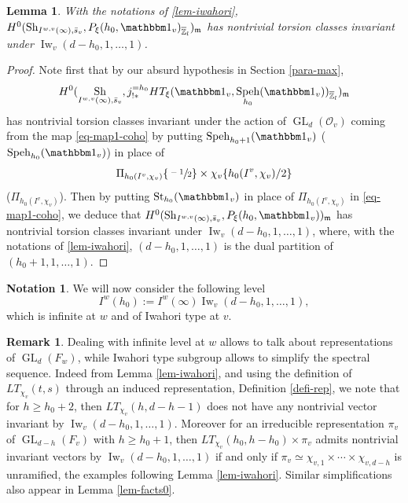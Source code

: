 \documentclass[JEP,XML,SOM,Unicode,published]{cedram}
\let\mathds\mathbbm
\DeclareMathOperator{\GL}{GL}
\theoremstyle{plain}
\newtheorem{lemma}[equation]{Lemma}
\theoremstyle{definition}
\newtheorem*{remark}{Remark}
\newtheorem{nota}[equation]{Notation}
\numberwithin{equation}{subsection}
\newcommand\Zm{{\mathbb Z}}
\newcommand\OC{{\mathcal O}}
\DeclareMathOperator{\sh}{Sh}
\DeclareMathOperator{\Iw}{Iw}
\DeclareMathOperator{\speh}{Speh}
\DeclareMathOperator{\st}{St}
\let \oo=\infty
\begin{document}
\begin{lemma} \label{lem-oo-finite}
With the notations of \ref{lem-iwahori},
$H^0(\sh_{I^{w,v}(\oo),\bar s_v},P_\xi(h_0,\mathds 1_v)_{\overline \Zm_l})_{\mathfrak m}$ has nontrivial torsion
classes invariant under $\Iw_v(d-h_0,1,\dots,1)$.
\end{lemma}

\begin{proof}
Note first that by our absurd hypothesis in Section \ref{para-max},
\[
H^0(\sh_{I^{w,v}(\oo),\bar s_v},j^{=h_0}_{!*}
HT_\xi(\mathds 1_v,\speh_{h_0}(\mathds 1_v))_{\overline \Zm_l})_{\mathfrak m}
\]
has
nontrivial torsion classes invariant under the action of $\GL_d(\OC_v)$ coming
from the map \eqref{eq-map1-coho} by putting
$\speh_{h_0+1}(\mathds 1_v)$ (\resp $\speh_{h_0}(\mathds 1_v)$)
in place of
\[
\Pi_{h_0(I^v,\chi_v)} \{\sfrac{-1}{2}\} \times \chi_v \{h_0(I^v,\chi_v)/2\}
\]
(\resp $\Pi_{h_0(I^v,\chi_v)}$).
Then by putting $\st_{h_0}(\mathds 1_v)$ in place of $\Pi_{h_0(I^v,\chi_v)}$
in \eqref{eq-map1-coho}, we deduce that
$H^0(\sh_{I^{w,v}(\oo),\bar s_v},P_\xi(h_0,\mathds 1_v))_{\mathfrak m}$ has nontrivial torsion
classes invariant under $\Iw_v(d-h_0,1,\dots,1)$, where, with
the notations of \ref{lem-iwahori}, $(d-h_0,1,\dots,1)$ is the dual
partition of $(h_0+1,1,\dots,1)$.
\end{proof}

\begin{nota}
We will now consider the following level
\[
I^w(h_0):=I^w(\oo) \Iw_v(d-h_0,1,\dots,1),
\]
which is infinite at $w$ and of Iwahori type at $v$.
\end{nota}

\begin{remark}
Dealing with infinite level at $w$ allows to talk about
representations of $\GL_d(F_w)$, while
Iwahori type subgroup allows to simplify the spectral sequence. Indeed
from Lemma \ref{lem-iwahori}, and using the definition of $LT_{\chi_v}(t,s)$
through an induced representation, \cf Definition \ref{defi-rep},
we note that
for $h \geq h_0+2$, then $LT_{\chi_v}(h,d-h-1)$ does not have any nontrivial
vector invariant by $\Iw_v(d-h_0,1,\dots,1)$. Moreover for an irreducible
representation $\pi_v$ of $\GL_{d-h}(F_v)$ with $h \geq h_0+1$,
then \hbox{$LT_{\chi_v}(h_0,h-h_0) \times \pi_v$}
admits nontrivial invariant vectors by $\Iw_v(d-h_0,1,\dots,1)$ if and only if
$\pi_v \simeq \chi_{v,1} \times \cdots \times \chi_{v,d-h}$ is unramified, \cf the
examples following Lemma \ref{lem-iwahori}.
Similar simplifications also appear in Lemma \ref{lem-facts0}.
\end{remark}
\end{document}
